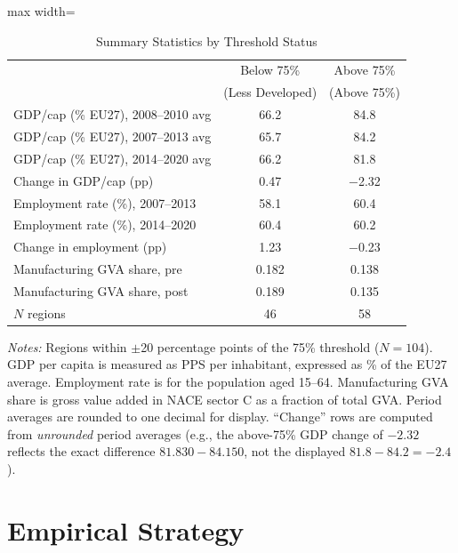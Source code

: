 \documentclass[12pt]{article}
\begin{document}
\begin{table}[H]
\centering
\caption{Summary Statistics by Threshold Status}
\label{tab:sumstats}
\begin{threeparttable}
\begin{adjustbox}{max width=\textwidth}
\begin{tabular}{lcc}
\toprule
 & Below 75\% & Above 75\% \\
 & (Less Developed) & (Above 75\%) \\
\midrule
GDP/cap (\% EU27), 2008--2010 avg & 66.2 & 84.8 \\
GDP/cap (\% EU27), 2007--2013 avg & 65.7 & 84.2 \\
GDP/cap (\% EU27), 2014--2020 avg & 66.2 & 81.8 \\
Change in GDP/cap (pp) & 0.47 & $-$2.32 \\
Employment rate (\%), 2007--2013 & 58.1 & 60.4 \\
Employment rate (\%), 2014--2020 & 60.4 & 60.2 \\
Change in employment (pp) & 1.23 & $-$0.23 \\
Manufacturing GVA share, pre & 0.182 & 0.138 \\
Manufacturing GVA share, post & 0.189 & 0.135 \\
$N$ regions & 46 & 58 \\
\bottomrule
\end{tabular}
\end{adjustbox}
\begin{tablenotes}[flushleft]\small
\item \textit{Notes:} Regions within $\pm$20 percentage points of the 75\% threshold ($N = 104$). GDP per capita is measured as PPS per inhabitant, expressed as \% of the EU27 average. Employment rate is for the population aged 15--64. Manufacturing GVA share is gross value added in NACE sector C as a fraction of total GVA. Period averages are rounded to one decimal for display. ``Change'' rows are computed from \emph{unrounded} period averages (e.g., the above-75\% GDP change of $-2.32$ reflects the exact difference $81.830 - 84.150$, not the displayed $81.8 - 84.2 = -2.4$).
\end{tablenotes}
\end{threeparttable}
\end{table}

\section{Empirical Strategy}
\label{sec:empirical}
\end{document}
